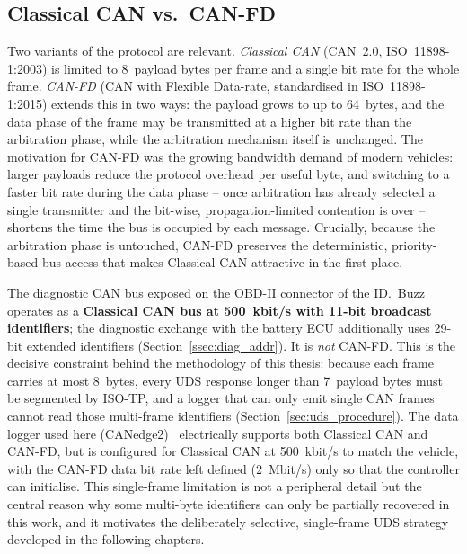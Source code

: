 \documentclass[11pt,a4paper,oneside,parskip=half]{scrreprt}
\begin{document}
\subsection{Classical CAN vs.\ CAN-FD}
Two variants of the protocol are relevant. \textit{Classical CAN} (CAN~2.0, ISO~11898-1:2003) is limited to 8~payload bytes per frame and a single bit rate for the whole frame. \textit{CAN-FD} (CAN with Flexible Data-rate, standardised in ISO~11898-1:2015) extends this in two ways: the payload grows to up to 64~bytes, and the data phase of the frame may be transmitted at a higher bit rate than the arbitration phase, while the arbitration mechanism itself is unchanged. The motivation for CAN-FD was the growing bandwidth demand of modern vehicles: larger payloads reduce the protocol overhead per useful byte, and switching to a faster bit rate during the data phase -- once arbitration has already selected a single transmitter and the bit-wise, propagation-limited contention is over -- shortens the time the bus is occupied by each message. Crucially, because the arbitration phase is untouched, CAN-FD preserves the deterministic, priority-based bus access that makes Classical CAN attractive in the first place.

The diagnostic CAN bus exposed on the OBD-II connector of the ID.~Buzz operates as a \textbf{Classical CAN bus at 500~kbit/s with 11-bit broadcast identifiers}; the diagnostic exchange with the battery ECU additionally uses 29-bit extended identifiers (Section~\ref{ssec:diag_addr}). It is \emph{not} CAN-FD. This is the decisive constraint behind the methodology of this thesis: because each frame carries at most 8~bytes, every UDS response longer than 7~payload bytes must be segmented by ISO-TP, and a logger that can only emit single CAN frames cannot read those multi-frame identifiers (Section~\ref{sec:uds_procedure}). The data logger used here (CANedge2)~\cite{csselectronics_canedge2} electrically supports both Classical CAN and CAN-FD, but is configured for Classical CAN at 500~kbit/s to match the vehicle, with the CAN-FD data bit rate left defined (2~Mbit/s) only so that the controller can initialise. This single-frame limitation is not a peripheral detail but the central reason why some multi-byte identifiers can only be partially recovered in this work, and it motivates the deliberately selective, single-frame UDS strategy developed in the following chapters.
\end{document}
